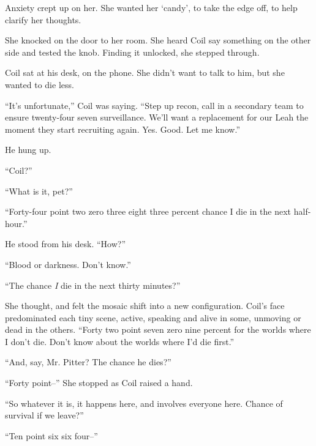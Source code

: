 Anxiety crept up on her.  She wanted her `candy', to take the edge off, to help clarify her thoughts.



She knocked on the door to her room.  She heard Coil say something on the other side and tested the knob.  Finding it unlocked, she stepped through.



Coil sat at his desk, on the phone.  She didn't want to talk to him, but she wanted to die less.



``It's unfortunate,'' Coil was saying.  ``Step up recon, call in a secondary team to ensure twenty-four seven surveillance.  We'll want a replacement for our Leah the moment they start recruiting again.  Yes.  Good.  Let me know.''



He hung up.



``Coil?''



``What is it, pet?''



``Forty-four point two zero three eight three percent chance I die in the next half-hour.''



He stood from his desk.  ``How?''



``Blood or darkness.  Don't know.''



``The chance \emph{I} die in the next thirty minutes?''



She thought, and felt the mosaic shift into a new configuration.  Coil's face predominated each tiny scene, active, speaking and alive in some, unmoving or dead in the others. ``Forty two point seven zero nine percent for the worlds where I don't die.  Don't know about the worlds where I'd die first.''



``And, say, Mr. Pitter?  The chance he dies?''



``Forty point--''  She stopped as Coil raised a hand.



``So whatever it is, it happens here, and involves everyone here.  Chance of survival if we leave?''



``Ten point six six four--''



